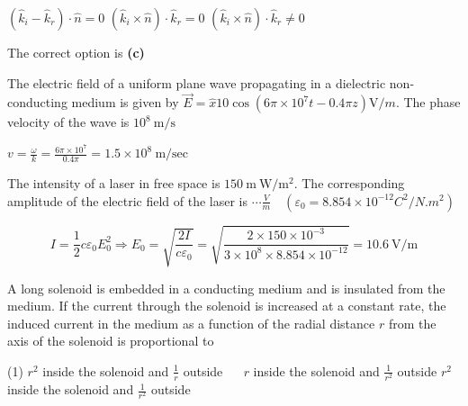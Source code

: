 \begin{enumerate}
\begin{tasks}
		\task[\textbf{B.}]$\left(\hat{k}_{i}-\hat{k}_{r}\right) \cdot \hat{n}=0$
		\task[\textbf{C.}]$\left(\hat{k}_{i} \times \hat{n}\right) \cdot \hat{k}_{r}=0$
		\task[\textbf{D.}]$\left(\hat{k}_{i} \times \hat{n}\right) \cdot \hat{k}_{r} \neq 0$
	\end{tasks}
	\begin{answer}
		The correct option is \textbf{(c)}	
	\end{answer}
	\begin{minipage}{\textwidth}
		\item The electric field of a uniform plane wave propagating in a dielectric non-conducting medium is given by $\vec{E}=\hat{x} 10 \cos \left(6 \pi \times 10^{7} t-0.4 \pi z\right) \mathrm{V} / m$. The phase velocity of the wave is $10^{8} \mathrm{~m} / \mathrm{s}$ 
	\end{minipage}
	\begin{answer}
		$v=\frac{\omega}{k}=\frac{6 \pi \times 10^{7}}{0.4 \pi}=1.5 \times 10^{8} \mathrm{~m} / \mathrm{sec}$	
	\end{answer}
	\begin{minipage}{\textwidth}
		\item The intensity of a laser in free space is $150 \mathrm{~m} \mathrm{~W} / \mathrm{m}^{2}$. The corresponding amplitude of the electric field of the laser is $\cdots\frac{V}{m} \quad\left(\varepsilon_{0}=8.854 \times 10^{-12} C^{2} / N . m^{2}\right)$
	\end{minipage}
	\begin{answer}
		$$I=\frac{1}{2} c \varepsilon_{0} E_{0}^{2} \Rightarrow E_{0}=\sqrt{\frac{2 I}{c \varepsilon_{0}}}=\sqrt{\frac{2 \times 150 \times 10^{-3}}{3 \times 10^{8} \times 8.854 \times 10^{-12}}}=10.6 \mathrm{~V} / \mathrm{m}	$$
	\end{answer}
	\begin{minipage}{\textwidth}
		\item A long solenoid is embedded in a conducting medium and is insulated from the medium. If the current through the solenoid is increased at a constant rate, the induced current in the medium as a function of the radial distance $r$ from the axis of the solenoid is proportional to
	\end{minipage}
	\begin{tasks}(1)
		\task[\textbf{A.}] $r^{2}$ inside the solenoid and $\frac{1}{r}$ outside $\quad$  
		\task[\textbf{B.}]$r$ inside the solenoid and $\frac{1}{r^{2}}$ outside
		\task[\textbf{C.}] $r^{2}$ inside the solenoid and $\frac{1}{r^{2}}$ outside

\end{tasks}
\end{enumerate}
